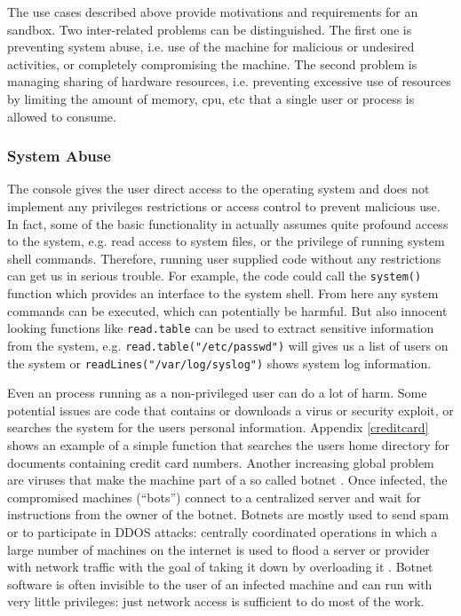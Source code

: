 \documentclass[article]{jss}
\begin{document}
The use cases described above provide motivations and requirements for an
 sandbox. Two inter-related problems can be distinguished. The first
one is preventing system abuse, i.e. use of the machine for malicious or
undesired activities, or completely compromising the machine. The second
problem is managing sharing of hardware resources, i.e. preventing excessive
use of resources by limiting the amount of memory, cpu, etc that a single user
or process is allowed to consume.

\subsubsection{System Abuse}

The  console gives the user direct access to the operating system
and does not implement any privileges restrictions or access control to prevent
malicious use. In fact, some of the basic functionality in  actually
assumes quite profound access to the system, e.g. read access to system files,
or the privilege of running system shell commands. Therefore, running user
supplied  code without any restrictions can get us in serious
trouble. For example, the code could call the \texttt{system()} function which
provides an interface to the system shell. From here any system commands can be
executed, which can potentially be harmful. But also innocent looking functions
like \texttt{read.table} can be used to extract sensitive information from the
system, e.g. \texttt{read.table("/etc/passwd")} will gives us a list of users
on the system or \texttt{readLines("/var/log/syslog")} shows system log
information.

Even an  process running as a non-privileged user can do a lot of
harm. Some potential issues are code that contains or downloads a virus or
security exploit, or searches the system for the users personal information.
Appendix \ref{creditcard} shows an example of a simple function that searches
the users home directory for documents containing credit card numbers. Another
increasing global problem are viruses that make the machine part of a so called
botnet \citep{abu2006multifaceted}. Once infected, the compromised machines
(``bots'') connect to a centralized server and wait for instructions from the
owner of the botnet. Botnets are mostly used to send spam or to participate in
DDOS attacks: centrally coordinated operations in which a large number of
machines on the internet is used to flood a server or provider with network
traffic with the goal of taking it down by overloading it
\citep{mirkovic2004taxonomy}. Botnet software is often invisible to the user
of an infected machine and can run with very little privileges: just network
access is sufficient to do most of the work.
\end{document}
